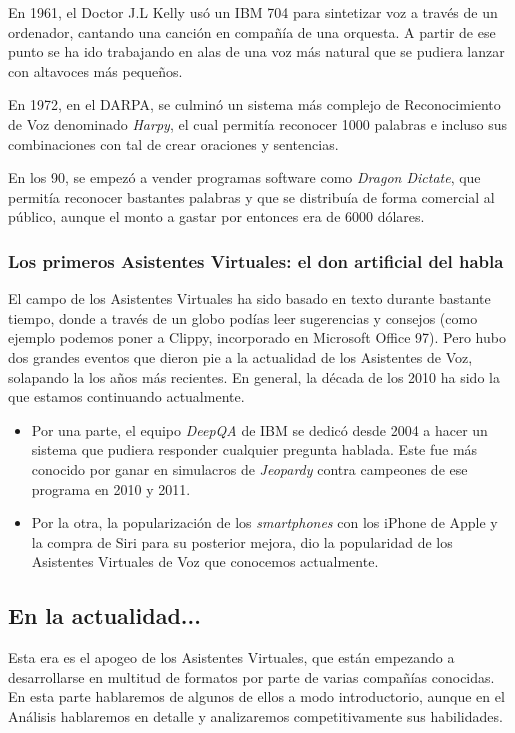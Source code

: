 En 1961, el Doctor J.L Kelly usó un IBM 704 para sintetizar voz a través de un ordenador, cantando una canción en compañía de una orquesta. A partir de ese punto se ha ido trabajando en alas de una voz más natural que se pudiera lanzar con altavoces más pequeños.

En 1972, en el DARPA, se culminó un sistema más complejo de Reconocimiento de Voz denominado \textit{Harpy}, el cual permitía reconocer 1000 palabras e incluso sus combinaciones con tal de crear oraciones y sentencias.

En los 90, se empezó a vender programas software como \textit{Dragon Dictate}, que permitía reconocer bastantes palabras y que se distribuía de forma comercial al público, aunque el monto a gastar por entonces era de 6000 dólares.

\subsubsection{Los primeros Asistentes Virtuales: el don artificial del habla}

El campo de los Asistentes Virtuales ha sido basado en texto durante bastante tiempo, donde a través de un globo podías leer sugerencias y consejos (como ejemplo podemos poner a Clippy, incorporado en 	Microsoft Office 97). Pero hubo dos grandes eventos que dieron pie a la actualidad de los Asistentes de Voz, solapando la los años más recientes. En general, la década de los 2010 ha sido la que estamos continuando actualmente.

\begin{itemize}
	\item Por una parte, el equipo \textit{DeepQA} de IBM se dedicó desde 2004 a hacer un sistema que pudiera responder cualquier pregunta hablada. Este fue más conocido por ganar en simulacros de \textit{Jeopardy} contra campeones de ese programa en 2010 y 2011.
	\item Por la otra, la popularización de los \textit{smartphones} con los iPhone de Apple y la compra de Siri para su posterior mejora, dio la popularidad de los Asistentes Virtuales de Voz que conocemos actualmente.
\end{itemize}

\subsection{En la actualidad...}
Esta era es el apogeo de los Asistentes Virtuales, que están empezando a desarrollarse en multitud de formatos por parte de varias compañías conocidas. En esta parte hablaremos de algunos de ellos a modo introductorio, aunque en el Análisis hablaremos en detalle y analizaremos competitivamente sus habilidades.

